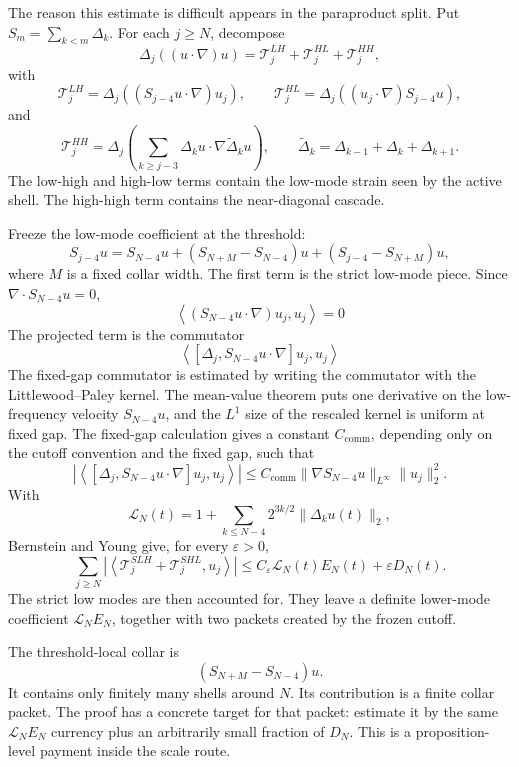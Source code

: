 The reason this estimate is difficult appears in the paraproduct split.  Put
\(S_m=\sum_{k<m}\Delta_k\).  For each \(j\ge N\), decompose
\[
  \Delta_j((u\cdot\nabla)u)
  =
  \mathcal T^{LH}_j+\mathcal T^{HL}_j+\mathcal T^{HH}_j,
\]
with
\[
  \mathcal T^{LH}_j
  =
  \Delta_j((S_{j-4}u\cdot\nabla)u_j),
  \qquad
  \mathcal T^{HL}_j
  =
  \Delta_j((u_j\cdot\nabla)S_{j-4}u),
\]
and
\[
  \mathcal T^{HH}_j
  =
  \Delta_j\!\left(
  \sum_{k\ge j-3}\Delta_k u\cdot\nabla\widetilde\Delta_k u
  \right),
  \qquad
  \widetilde\Delta_k=\Delta_{k-1}+\Delta_k+\Delta_{k+1}.
\]
The low-high and high-low terms contain the low-mode strain seen by the
active shell.  The high-high term contains the near-diagonal cascade.

Freeze the low-mode coefficient at the threshold:
\[
  S_{j-4}u
  =
  S_{N-4}u
  +(S_{N+M}-S_{N-4})u
  +(S_{j-4}-S_{N+M})u,
\]
where \(M\) is a fixed collar width.  The first term is the strict low-mode
piece.  Since \(\nabla\cdot S_{N-4}u=0\),
\[
  \left\langle (S_{N-4}u\cdot\nabla)u_j,u_j\right\rangle=0
\]
The projected term is the commutator
\[
  \left\langle
  [\Delta_j,S_{N-4}u\cdot\nabla]u_j,u_j
  \right\rangle
\]
The fixed-gap commutator is estimated by writing the commutator with the
Littlewood--Paley kernel.  The mean-value theorem puts one derivative on the
low-frequency velocity \(S_{N-4}u\), and the \(L^1\) size of the rescaled
kernel is uniform at fixed gap.  The fixed-gap calculation gives a constant \(C_{\mathrm{comm}}\),
depending only on the cutoff convention and the fixed gap, such that
\[
  \left|
  \left\langle
  [\Delta_j,S_{N-4}u\cdot\nabla]u_j,u_j
  \right\rangle
  \right|
  \le C_{\mathrm{comm}}
  \|\nabla S_{N-4}u\|_{L^\infty}\|u_j\|_2^2.
\]
With
\[
  \mathcal L_N(t)
  =
  1+\sum_{k\le N-4}2^{3k/2}\|\Delta_k u(t)\|_2,
\]
Bernstein and Young give, for every \(\varepsilon>0\),
\[
  \sum_{j\ge N}
  \left|
  \left\langle
  \mathcal T^{SLH}_j+\mathcal T^{SHL}_j,u_j
  \right\rangle
  \right|
  \le
  C_\varepsilon \mathcal L_N(t)E_N(t)+\varepsilon D_N(t).
\]
The strict low modes are then accounted for.  They leave a definite lower-mode
coefficient \( \mathcal L_N E_N\), together with two packets created by the
frozen cutoff.

The threshold-local collar is
\[
  (S_{N+M}-S_{N-4})u.
\]
It contains only finitely many shells around \(N\).  Its contribution is a
finite collar packet.  The proof has a concrete target for that packet:
estimate it by the same \(\mathcal L_NE_N\) currency plus an arbitrarily
small fraction of \(D_N\).  This is a proposition-level payment inside the
scale route.

